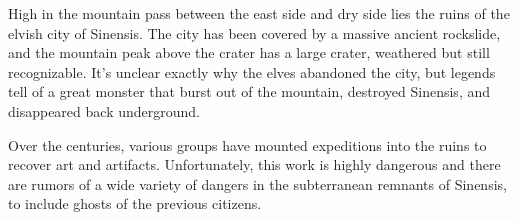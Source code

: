 High in the mountain pass between the east side and dry side lies the ruins of the elvish city of Sinensis.
The city has been covered by a massive ancient rockslide, and the mountain peak above the crater has a large crater, weathered but still recognizable.
It's unclear exactly why the elves abandoned the city, but legends tell of a great monster that burst out of the mountain, destroyed Sinensis, and disappeared back underground.

Over the centuries, various groups have mounted expeditions into the ruins to recover art and artifacts.
Unfortunately, this work is highly dangerous and there are rumors of a wide variety of dangers in the subterranean remnants of Sinensis, to include ghosts of the previous citizens.

